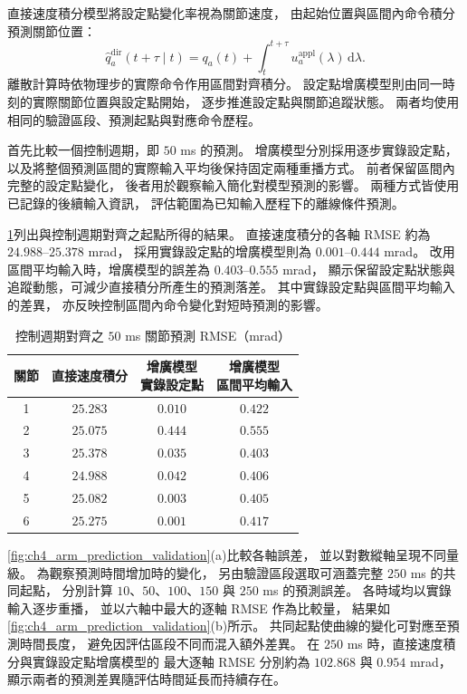 直接速度積分模型將設定點變化率視為關節速度，
由起始位置與區間內命令積分預測關節位置：
\begin{equation}
    \hat q_a^{\mathrm{dir}}(t+\tau\mid t)
    =q_a(t)+\int_t^{t+\tau}u_a^{\mathrm{appl}}(\lambda)\,\mathrm d\lambda.
    \label{eq:ch4_direct_velocity_prediction}
\end{equation}
離散計算時依物理步的實際命令作用區間對齊積分。
設定點增廣模型則由同一時刻的實際關節位置與設定點開始，
逐步推進設定點與關節追蹤狀態。
兩者均使用相同的驗證區段、預測起點與對應命令歷程。

首先比較一個控制週期，即 $50$ ms 的預測。
增廣模型分別採用逐步實錄設定點，
以及將整個預測區間的實際輸入平均後保持固定兩種重播方式。
前者保留區間內完整的設定點變化，
後者用於觀察輸入簡化對模型預測的影響。
兩種方式皆使用已記錄的後續輸入資訊，
評估範圍為已知輸入歷程下的離線條件預測。

\cref{tab:ch4_arm_prediction_rmse}列出與控制週期對齊之起點所得的結果。
直接速度積分的各軸 RMSE 約為 $24.988$--$25.378$ mrad，
採用實錄設定點的增廣模型則為 $0.001$--$0.444$ mrad。
改用區間平均輸入時，增廣模型的誤差為 $0.403$--$0.555$ mrad，
顯示保留設定點狀態與追蹤動態，可減少直接積分所產生的預測落差。
其中實錄設定點與區間平均輸入的差異，
亦反映控制區間內命令變化對短時預測的影響。

\begin{table}[htbp]
    \centering
    \caption{控制週期對齊之 $50$ ms 關節預測 RMSE（mrad）}
    \label{tab:ch4_arm_prediction_rmse}
    \begingroup
    \small
    \renewcommand{\arraystretch}{1.25}
    \begin{tabular}{c c c c}
        \hline
        關節 & 直接速度積分
        & \shortstack{增廣模型\\實錄設定點}
        & \shortstack{增廣模型\\區間平均輸入} \\
        \hline
        1 & $25.283$ & $0.010$ & $0.422$ \\
        2 & $25.075$ & $0.444$ & $0.555$ \\
        3 & $25.378$ & $0.035$ & $0.403$ \\
        4 & $24.988$ & $0.042$ & $0.406$ \\
        5 & $25.082$ & $0.003$ & $0.405$ \\
        6 & $25.275$ & $0.001$ & $0.417$ \\
        \hline
    \end{tabular}
    \endgroup
\end{table}

\cref{fig:ch4_arm_prediction_validation}(a)比較各軸誤差，
並以對數縱軸呈現不同量級。
為觀察預測時間增加時的變化，
另由驗證區段選取可涵蓋完整 $250$ ms 的共同起點，
分別計算 $10$、$50$、$100$、$150$ 與 $250$ ms 的預測誤差。
各時域均以實錄輸入逐步重播，
並以六軸中最大的逐軸 RMSE 作為比較量，
結果如\cref{fig:ch4_arm_prediction_validation}(b)所示。
共同起點使曲線的變化可對應至預測時間長度，
避免因評估區段不同而混入額外差異。
在 $250$ ms 時，直接速度積分與實錄設定點增廣模型的
最大逐軸 RMSE 分別約為 $102.868$ 與 $0.954$ mrad，
顯示兩者的預測差異隨評估時間延長而持續存在。

